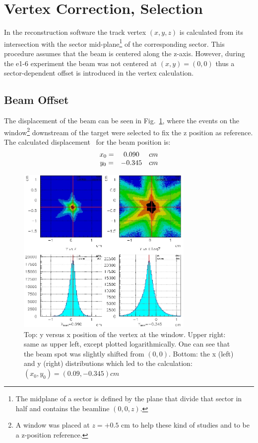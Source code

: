 \section{Vertex Correction, Selection}\label{sec:vertex-correction-selection}

In the reconstruction software the track vertex $(x,y,z)$ is calculated
from its intersection with the sector mid-plane\footnote{The midplane of
a sector is defined by the plane that divide that sector in half and contains
the beamline $(0,0,z)$.} of the corresponding sector.
This procedure assumes that the beam is centered along the z-axis.
However, during the e1-6 experiment the beam was not centered at $(x,y) = (0,0)$ thus
a sector-dependent offset is introduced in the vertex calculation.

\subsection{Beam Offset}\label{subsec:beam-offset}
The displacement of the beam can be seen in Fig.~\ref{fig:vertex_id}, where the events
on the window\footnote{A window was placed at $z=+0.5$ cm to help these kind of
studies and to be a z-position reference.} downstream of the target were
selected to fix the z position as reference.
The calculated displacement~\cite{bib:valeri_vertex} for the beam position is:
\[
\begin{array}{c c c}
    x_0 = & 0.090  & cm \\
    y_0 = & -0.345 & cm
\end{array}
\]

\begin{figure}[ht]
    \centering
    \includegraphics[width=0.76\textwidth ]{img/beam_displacement}
    \caption{Top: y versus x position of the vertex at the window.
    Upper right: same as upper left, except plotted logarithmically.
    One can see that the beam spot was slightly shifted from $(0,0)$.
    Bottom: the x (left) and y (right) distributions which led to
    the calculation: $(x_0, y_0) = (0.09, -0.345)cm$ }
    \label{fig:vertex_id}
\end{figure}

